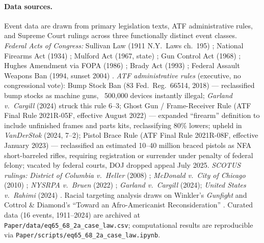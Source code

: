\paragraph{Data sources.}
Event data are drawn from primary legislation texts, ATF administrative rules, and Supreme Court rulings across three functionally distinct event classes. \textit{Federal Acts of Congress:} Sullivan Law (1911 N.Y.\ Laws ch.\ 195) \cite{sullivanlaw}; National Firearms Act (1934) \cite{nfa1934}; Mulford Act (1967, state) \cite{mulford1967}; Gun Control Act (1968) \cite{gca1968}; Hughes Amendment via FOPA (1986) \cite{hughes1986}; Brady Act (1993) \cite{brady1993}; Federal Assault Weapons Ban (1994, sunset 2004) \cite{awb1994}. \textit{ATF administrative rules} (executive, no congressional vote): Bump Stock Ban (83 Fed.\ Reg.\ 66514, 2018) --- reclassified bump stocks as machine guns, ~500,000 devices instantly illegal; \textit{Garland v.\ Cargill} (2024) struck this rule 6--3; Ghost Gun / Frame-Receiver Rule (ATF Final Rule 2021R-05F, effective August 2022) --- expanded ``firearm'' definition to include unfinished frames and parts kits, reclassifying 80\% lowers; upheld in \textit{VanDerStok} (2024, 7--2); Pistol Brace Rule (ATF Final Rule 2021R-08F, effective January 2023) --- reclassified an estimated 10--40 million braced pistols as NFA short-barreled rifles, requiring registration or surrender under penalty of federal felony; vacated by federal courts, DOJ dropped appeal July 2025. \textit{SCOTUS rulings:} \textit{District of Columbia v.\ Heller} (2008) \cite{heller}; \textit{McDonald v.\ City of Chicago} (2010) \cite{mcdonald}; \textit{NYSRPA v.\ Bruen} (2022) \cite{bruen}; \textit{Garland v.\ Cargill} (2024); \textit{United States v.\ Rahimi} (2024) \cite{rahimi2024}. Racial targeting analysis draws on Winkler's \textit{Gunfight} \cite{winkler2011} and Cottrol \& Diamond's ``Toward an Afro-Americanist Reconsideration'' \cite{cottrol_diamond1991}. Curated data (16 events, 1911--2024) are archived at \texttt{Paper/data/eq65\_68\_2a\_case\_law.csv}; computational results are reproducible via \texttt{Paper/scripts/eq65\_68\_2a\_case\_law.ipynb}.

